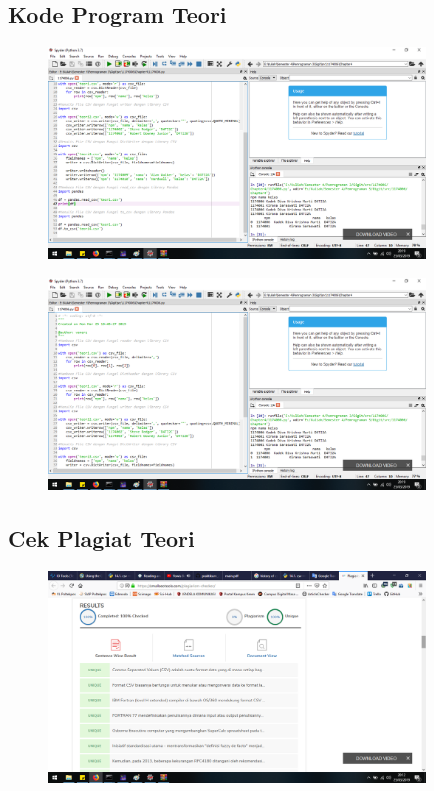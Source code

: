 \subsection{Kode Program Teori}
\begin{figure}[H]
	\includegraphics[width=10cm]{figures/4/1174006/Teori/kode_teori1.png}
	\centering
\end{figure}

\begin{figure}[H]
	\includegraphics[width=10cm]{figures/4/1174006/Teori/kode_teori2.png}
	\centering
\end{figure}

\subsection{Cek Plagiat Teori}

\begin{figure}[H]
	\includegraphics[width=10cm]{figures/4/1174006/Teori/plagiat_teori.png}
	\centering
\end{figure}


